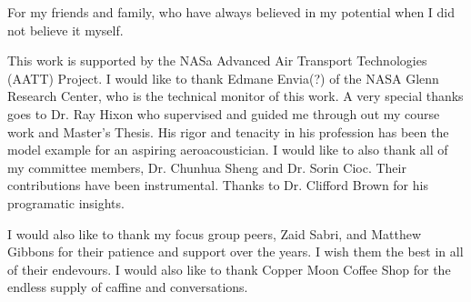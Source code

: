 \documentclass[12pt]{uthesis-v12}  %
\begin{document}

\begin{abstractpage}

\end{abstractpage}


\begin{dedication}
\noindent For my friends and family, who have always believed in my potential 
when I did not believe it myself. 
\end{dedication}


\begin{acknowledgments}
\noindent This work is supported by the NASa Advanced Air Transport Technologies
(AATT) Project. I would like to thank Edmane Envia(?) of the NASA Glenn Research Center, who
is the technical monitor of this work. 
A very special thanks goes to Dr. Ray Hixon who supervised and guided me through
out my course work and Master's Thesis. His rigor and tenacity in his profession has 
been the model example for an aspiring aeroacoustician. 
I would like to also thank all of my committee members, Dr. Chunhua Sheng and 
Dr. Sorin Cioc. Their contributions have been instrumental. Thanks to Dr. Clifford
Brown for his programatic insights. 

I would also like to thank my focus group peers, Zaid Sabri, and Matthew Gibbons 
for their patience and support over the years. I wish them the best in all of 
their endevours.
I would also like to thank Copper Moon Coffee Shop for the endless supply of caffine 
and conversations.


\end{acknowledgments}
\end{document}
